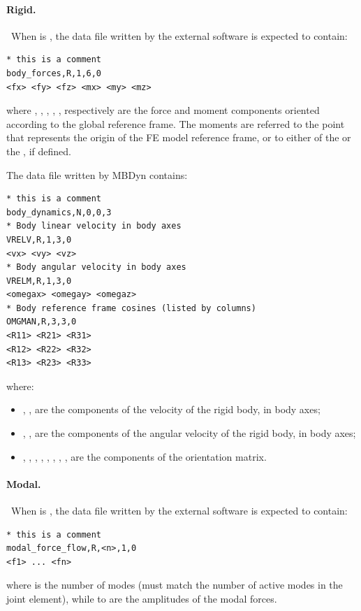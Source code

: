 \paragraph{Rigid.} \
When  is , the data file written by the external software
is expected to contain:
\begin{verbatim}
* this is a comment
body_forces,R,1,6,0
<fx> <fy> <fz> <mx> <my> <mz>
\end{verbatim}
where , , , , , 
respectively are the force and moment components
oriented according to the global reference frame.
The moments are referred to the point that represents the origin
of the FE model reference frame, or to either of
the  or the , if defined.

The data file written by MBDyn contains:
\begin{verbatim}
* this is a comment
body_dynamics,N,0,0,3
* Body linear velocity in body axes
VRELV,R,1,3,0
<vx> <vy> <vz>
* Body angular velocity in body axes
VRELM,R,1,3,0
<omegax> <omegay> <omegaz>
* Body reference frame cosines (listed by columns)
OMGMAN,R,3,3,0
<R11> <R21> <R31>
<R12> <R22> <R32>
<R13> <R23> <R33>
\end{verbatim}
where:
\begin{itemize}
\item {}, ,  are the components of the velocity
	of the rigid body, in body axes;
\item {}, ,  are the components
	of the angular velocity of the rigid body, in body axes;
\item {}, , , , , ,
	, ,  are the components
	of the orientation matrix.
\end{itemize}

\paragraph{Modal.} \
When  is , the data file written by the external software
is expected to contain:
\begin{verbatim}
* this is a comment
modal_force_flow,R,<n>,1,0
<f1> ... <fn>
\end{verbatim}
where  is the number of modes (must match the number of active modes
in the  joint element), while  to  are the amplitudes
of the modal forces.


